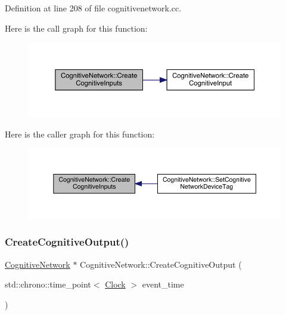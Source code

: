 Definition at line 208 of file cognitivenetwork.\+cc.

Here is the call graph for this function\+:
\nopagebreak
\begin{figure}[H]
\begin{center}
\leavevmode
\includegraphics[width=350pt]{class_cognitive_network_a0833f7b587f14e0c0778661a56bce957_cgraph}
\end{center}
\end{figure}
Here is the caller graph for this function\+:
\nopagebreak
\begin{figure}[H]
\begin{center}
\leavevmode
\includegraphics[width=350pt]{class_cognitive_network_a0833f7b587f14e0c0778661a56bce957_icgraph}
\end{center}
\end{figure}
\mbox{\label{class_cognitive_network_ac220350499bd323bd8f24ff0050cd60d}} 
\subsubsection{\texorpdfstring{Create\+Cognitive\+Output()}{CreateCognitiveOutput()}}
{\footnotesize\ttfamily \hyperlink{class_cognitive_network}{Cognitive\+Network} $\ast$ Cognitive\+Network\+::\+Create\+Cognitive\+Output (\begin{DoxyParamCaption}\item[{std\+::chrono\+::time\+\_\+point$<$ \hyperlink{universe_8h_a0ef8d951d1ca5ab3cfaf7ab4c7a6fd80}{Clock} $>$}]{event\+\_\+time }\end{DoxyParamCaption})}



